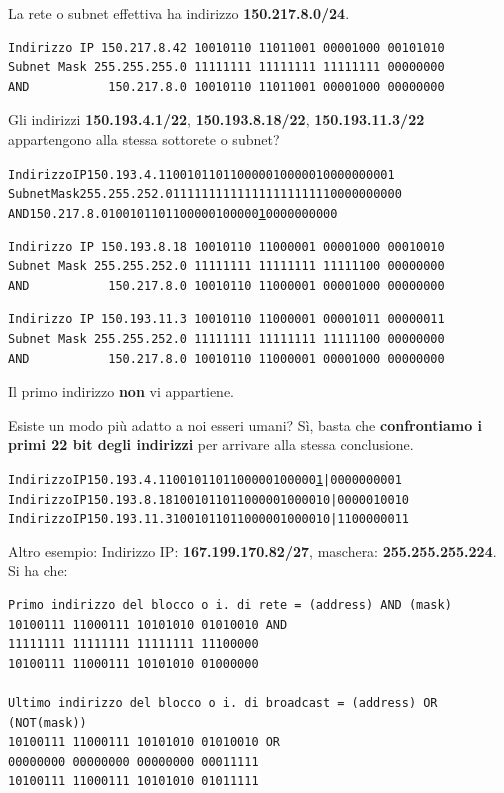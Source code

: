\documentclass[11pt,a4paper,oneside]{book}
\theoremstyle{definition}
\begin{document}
La rete o subnet effettiva ha indirizzo \textbf{150.217.8.0/24}.
\begin{verbatim}
Indirizzo IP 150.217.8.42 10010110 11011001 00001000 00101010
Subnet Mask 255.255.255.0 11111111 11111111 11111111 00000000
AND           150.217.8.0 10010110 11011001 00001000 00000000
\end{verbatim}
Gli indirizzi \textbf{150.193.4.1/22}, \textbf{150.193.8.18/22}, \textbf{150.193.11.3/22} appartengono alla stessa sottorete o subnet?
\begin{alltt}
Indirizzo IP 150.193.4.1  10010110 11000001 00000100 00000001
Subnet Mask 255.255.252.0 11111111 11111111 11111100 00000000
AND           150.217.8.0 10010110 11000001 00000\underline{1}00 00000000
\end{alltt}
\begin{verbatim}
Indirizzo IP 150.193.8.18 10010110 11000001 00001000 00010010
Subnet Mask 255.255.252.0 11111111 11111111 11111100 00000000
AND           150.217.8.0 10010110 11000001 00001000 00000000
\end{verbatim}
\begin{verbatim}
Indirizzo IP 150.193.11.3 10010110 11000001 00001011 00000011
Subnet Mask 255.255.252.0 11111111 11111111 11111100 00000000
AND           150.217.8.0 10010110 11000001 00001000 00000000
\end{verbatim}
Il primo indirizzo \textbf{non} vi appartiene.

Esiste un modo più adatto a noi esseri umani? Sì, basta che \textbf{confrontiamo i primi 22 bit degli indirizzi} per arrivare alla stessa conclusione.

\begin{alltt}
Indirizzo IP 150.193.4.1  10010110 11000001 00000\underline{1} | 00 00000001
Indirizzo IP 150.193.8.18 10010110 11000001 000010 | 00 00010010
Indirizzo IP 150.193.11.3 10010110 11000001 000010 | 11 00000011
\end{alltt}

Altro esempio:\newline
Indirizzo IP: \textbf{167.199.170.82/27}, maschera: \textbf{255.255.255.224}. Si ha che:
\begin{verbatim}
Primo indirizzo del blocco o i. di rete = (address) AND (mask)
10100111 11000111 10101010 01010010 AND
11111111 11111111 11111111 11100000
10100111 11000111 10101010 01000000

Ultimo indirizzo del blocco o i. di broadcast = (address) OR (NOT(mask))
10100111 11000111 10101010 01010010 OR
00000000 00000000 00000000 00011111
10100111 11000111 10101010 01011111
\end{verbatim}
\end{document}
